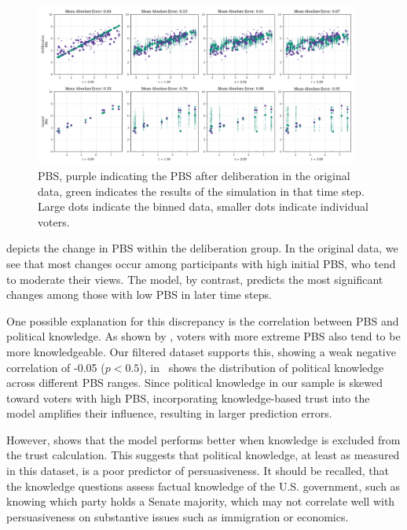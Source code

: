 \begin{figure}[ht]
	\begin{center}
		\includegraphics[width=0.95\textwidth]{Figures/pbs_scores.png}
	\end{center}
	\caption{ PBS, purple indicating the PBS after deliberation in the original data, green indicates the results of the simulation in that time step. Large dots indicate the binned data, smaller dots indicate individual voters.}\label{fig:pbs}
\end{figure}

 depicts the change in PBS within the deliberation
group. In the original data, we see that most changes occur among participants
with high initial PBS, who tend to moderate their views. The model, by
contrast, predicts the most significant changes among those with low PBS in
later time steps.

One possible explanation for this discrepancy is the correlation between PBS
and political knowledge. As shown by \citet{fishkinCanDeliberationHave2024},
voters with more extreme PBS also tend to be more knowledgeable. Our
filtered dataset supports this, showing a weak negative correlation of -0.05
($p < 0.5$),  in~
shows the distribution of political knowledge across different PBS ranges.
Since political knowledge in our sample is skewed toward voters with high PBS,
incorporating knowledge-based trust into the model amplifies their influence,
resulting in larger prediction errors.

However,  shows that the model performs better when
knowledge is excluded from the trust calculation. This suggests that political
knowledge, at least as measured in this dataset, is a poor predictor of
persuasiveness. It should be recalled, that the knowledge questions assess factual
knowledge of the U.S. government, such as knowing which party holds a
Senate majority, which may not correlate well with persuasiveness on substantive
issues such as immigration or economics.


